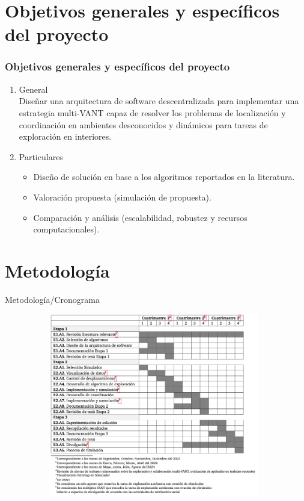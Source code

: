 \documentclass[
	12pt, %
	aspectratio=169, %
]{beamer}
\begin{document}
\section{Objetivos generales y específicos del proyecto}
\begin{frame}
  \frametitle{Objetivos generales y específicos del proyecto}
  \begin{enumerate}
  \item<1-> General \\
    Diseñar una arquitectura de software descentralizada para implementar una estrategia multi-VANT capaz de resolver los problemas de localización y coordinación en ambientes desconocidos y dinámicos para tareas de exploración en interiores.
    \pause
  \item<2-> Particulares\\
    \begin{itemize}
    \item Diseño de solución en base a los algoritmos reportados en la literatura.
      \pause
    \item Valoración propuesta (simulación de propuesta).
      \pause
    \item Comparación y análisis (escalabilidad, robustez y recursos computacionales).
    \end{itemize}
  \end{enumerate}
\end{frame}

\section{Metodología}
\begin{frame}{Metodología/Cronograma}
  \begin{figure}
    \centering
    \includegraphics[width=11cm, height=8cm]{cronograma}
  \end{figure}
\end{frame}
\end{document}
